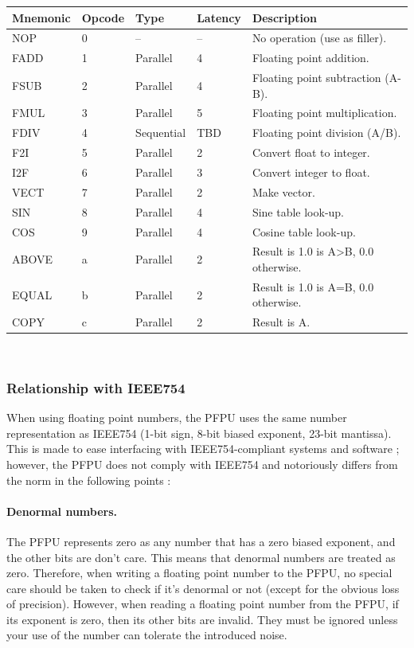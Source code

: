 \documentclass[a4paper,11pt]{article}
\begin{document}
\begin{tabularx}{\textwidth}{|l|l|l|l|X|}
\hline
\bf Mnemonic & \bf Opcode & \bf Type & \bf Latency & \bf Description \\
\hline
NOP & 0 & -- & -- & No operation (use as filler). \\
\hline
FADD & 1 & Parallel & 4 & Floating point addition. \\
\hline
FSUB & 2 & Parallel & 4 & Floating point subtraction (A-B). \\
\hline
FMUL & 3 & Parallel & 5 & Floating point multiplication. \\
\hline
FDIV & 4 & Sequential & TBD & Floating point division (A/B). \\
\hline
F2I & 5 & Parallel & 2 & Convert float to integer. \\
\hline
I2F & 6 & Parallel & 3 & Convert integer to float. \\
\hline
VECT & 7 & Parallel & 2 & Make vector. \\
\hline
SIN & 8 & Parallel & 4 & Sine table look-up. \\
\hline
COS & 9 & Parallel & 4 & Cosine table look-up. \\
\hline
ABOVE & a & Parallel & 2 & Result is 1.0 is A>B, 0.0 otherwise. \\
\hline
EQUAL & b & Parallel & 2 & Result is 1.0 is A=B, 0.0 otherwise. \\
\hline
COPY & c & Parallel & 2 & Result is A. \\
\hline
\end{tabularx}\\

\subsubsection{Relationship with IEEE754}
When using floating point numbers, the PFPU uses the same number representation as IEEE754 (1-bit sign, 8-bit biased exponent, 23-bit mantissa). This is made to ease interfacing with IEEE754-compliant systems and software ; however, the PFPU does not comply with IEEE754 and notoriously differs from the norm in the following points :

\paragraph{Denormal numbers.} The PFPU represents zero as any number that has a zero biased exponent, and the other bits are don't care. This means that denormal numbers are treated as zero. Therefore, when writing a floating point number to the PFPU, no special care should be taken to check if it's denormal or not (except for the obvious loss of precision). However, when reading a floating point number from the PFPU, if its exponent is zero, then its other bits are invalid. They must be ignored unless your use of the number can tolerate the introduced noise.
\end{document}
